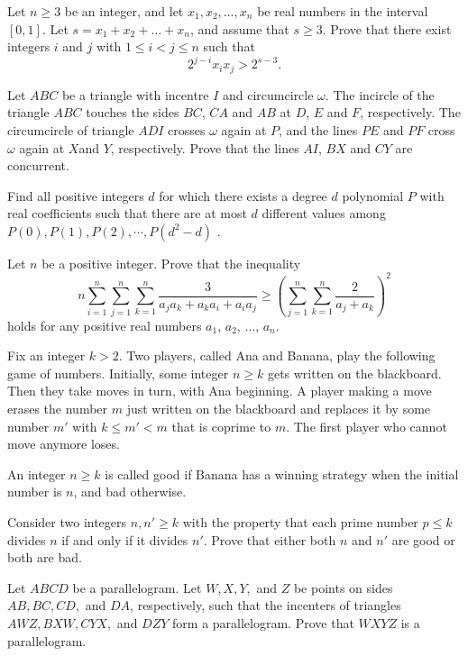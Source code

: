 \documentclass[11pt]{scrartcl}
\begin{document}
\begin{problem}[7550072974614174968]
Let $n \geqslant 3$ be an integer, and let $x_1,x_2,\ldots,x_n$ be real numbers in the interval $[0,1]$. Let $s=x_1+x_2+\ldots+x_n$, and assume that $s \geqslant 3$. Prove that there exist integers $i$ and $j$ with $1 \leqslant i<j \leqslant n$ such that
\[2^{j-i}x_ix_j>2^{s-3}.\]
\end{problem}
\begin{problem}[7553717274310387624]
Let $ABC$ be a triangle with incentre $I$ and circumcircle $\omega$. The incircle of the triangle $ABC$
touches the sides $BC$, $CA$ and $AB$ at $D$, $E$ and $F$, respectively. The circumcircle of triangle $ADI$ crosses $\omega$ again at $P$, and the lines $PE$ and $PF$ cross $\omega$ again at $X$and $Y$, respectively. Prove that the lines $AI$, $BX$ and $CY$ are concurrent.
\end{problem}
\begin{problem}[7583686967751031247]
	Find all positive integers $d$ for which there exists a degree $d$ polynomial $P$ with real coefficients such that there are at most $d$ different values among $P(0),P(1),P(2),\cdots,P(d^2-d)$ .
\end{problem}
\begin{problem}[7618399398127608097]
Let $n$ be a positive integer. Prove that the inequality
\[n \sum_{i=1}^n \sum_{j = 1}^n \sum_{k=1}^n \frac{3}{a_ja_k + a_ka_i + a_i a_j} \ge \left(\sum_{j=1}^n \sum_{k=1}^n \frac{2}{a_j + a_k}\right)^2 \]holds for any positive real numbers $a_1$, $a_2$, $\dots$, $a_n$.
\end{problem}
\begin{problem}[7636650160414045108]
Fix an integer $k>2$. Two players, called Ana and Banana, play the following game of numbers. Initially, some integer $n \ge k$ gets written on the blackboard. Then they take moves in turn, with Ana beginning. A player making a move erases the number $m$ just written on the blackboard and replaces it by some number $m'$ with $k \le m' < m$ that is coprime to $m$. The first player who cannot move anymore loses.

An integer $n \ge k $ is called good if Banana has a winning strategy when the initial number is $n$, and bad otherwise.

Consider two integers $n,n' \ge k$ with the property that each prime number $p \le k$ divides $n$ if and only if it divides $n'$. Prove that either both $n$ and $n'$ are good or both are bad.
\end{problem}
\begin{problem}[7689980261025088265]
Let $ABCD$ be a parallelogram. Let $W, X, Y,$ and $Z$ be points on sides $AB, BC, CD,$ and $DA$, respectively, such that the incenters of triangles $AWZ, BXW, CYX,$ and $DZY$ form a parallelogram. Prove that $WXYZ$ is a parallelogram.
\end{problem}
\end{document}
